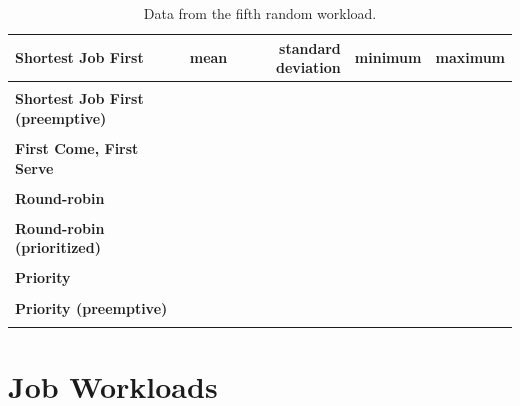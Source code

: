 \documentclass[12pt,letterpaper]{article}
\begin{document}
\begin{appendices}
			\begin{table}[H]
	 			\label{table:data-rand5}
	  			\caption{Data from the fifth random workload.}
		  		\begin{tabular}{l r r r r}
					\textbf{Shortest Job First} & mean & standard deviation & minimum & maximum\\
					\hline
					\\
					\textbf{Shortest Job First (preemptive)} \\
					\hline
					\\
					\textbf{First Come, First Serve} \\
					\hline
					\\
					\textbf{Round-robin} \\
					\hline
					\\
					\textbf{Round-robin (prioritized)} \\
					\hline
					\\
					\textbf{Priority} \\
					\hline
					\\
					\textbf{Priority (preemptive)} \\
					\hline
					\\
				\end{tabular}
			\end{table}
	\section{Job Workloads}
	\end{appendices}

	\clearpage
	\printbibliography
\end{document}
